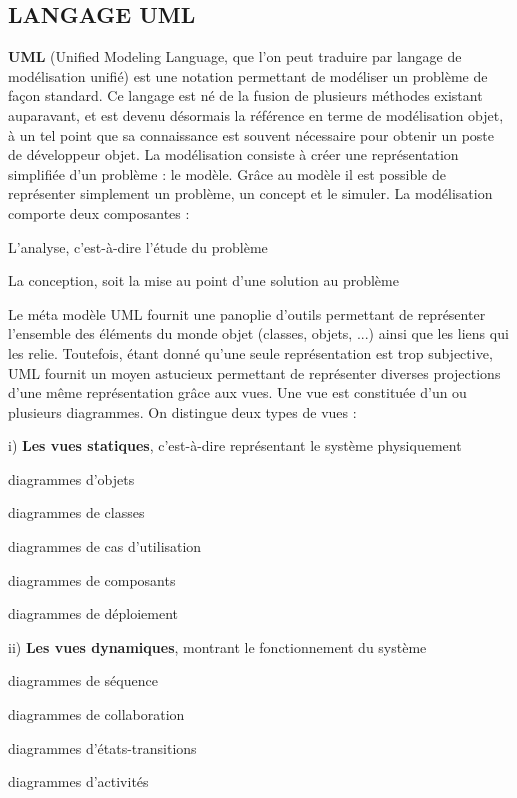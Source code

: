  \subsection{LANGAGE UML}
 \textbf{UML} (Unified Modeling Language, que l’on peut traduire par langage de modélisation unifié) est une notation permettant de modéliser un problème de façon standard. Ce langage est né de la fusion de plusieurs méthodes existant auparavant, et est devenu désormais la référence en terme de modélisation objet, à un tel point que sa connaissance est souvent nécessaire pour obtenir un poste de développeur objet. La modélisation consiste à créer une représentation simplifiée d’un problème : le modèle. Grâce au modèle il est possible de représenter simplement un problème, un concept et le simuler. La modélisation comporte deux composantes :
 \begin{list}{•}{ }
 \item L’analyse, c’est-à-dire l’étude du problème
 \item La conception, soit la mise au point d’une solution au problème\\
 \end{list}

Le méta modèle UML fournit une panoplie d’outils permettant de représenter l’ensemble des éléments du monde objet (classes, objets, ...) ainsi que les liens qui les relie. Toutefois, étant donné qu’une seule représentation est trop subjective, UML fournit un moyen astucieux permettant de représenter diverses projections d’une même représentation grâce aux vues. Une vue est constituée d’un ou plusieurs diagrammes. On distingue deux types de vues :

i)	\textbf{Les vues statiques}, c’est-à-dire représentant le système physiquement
	\begin{list}{•}{ }
		\item diagrammes d’objets
		\item diagrammes de classes
		\item diagrammes de cas d’utilisation
		\item diagrammes de composants
		\item diagrammes de déploiement\\
	\end{list}
	 
ii)	\textbf{Les vues dynamiques}, montrant le fonctionnement du système
\begin{list}{•}{ }
		\item diagrammes de séquence
		\item diagrammes de collaboration
		\item diagrammes d’états-transitions
		\item diagrammes d’activités
	\end{list}

